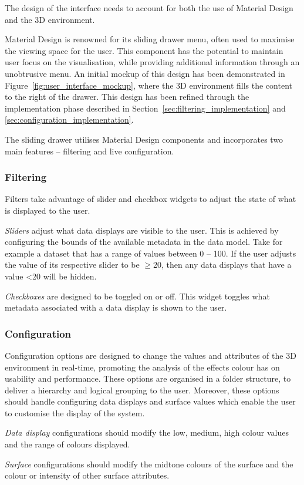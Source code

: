 {{		The design of the interface needs to account for both the use of Material Design and the 3D environment. 

		Material Design is renowned for its sliding drawer menu, often used to maximise the viewing space for the user. This component has the potential to maintain user focus on the visualisation, while providing additional information through an unobtrusive menu. An initial mockup of this design has been demonstrated in Figure~\ref{fig:user_interface_mockup}, where the 3D environment fills the content to the right of the drawer. This design has been refined through the implementation phase described in Section~\ref{sec:filtering_implementation} and \ref{sec:configuration_implementation}.

		

		The sliding drawer utilises Material Design components and incorporates two main features -- filtering and live configuration.

		\subsubsection{Filtering} {
		\label{sec:filtering}

			Filters take advantage of slider and checkbox widgets to adjust the state of what is displayed to the user.

			\emph{Sliders} adjust what data displays are visible to the user. This is achieved by configuring the bounds of the available metadata in the data model. Take for example a dataset that has a range of values between 0 -- 100. If the user adjusts the value of its respective slider to be $\ge$20, then any data displays that have a value \textless20 will be hidden.
			
			\emph{Checkboxes} are designed to be toggled on or off. This widget toggles what metadata associated with a data display is shown to the user.

		}

		\subsubsection{Configuration} {
		\label{sec:configuration}

			Configuration options are designed to change the values and attributes of the 3D environment in real-time, promoting the analysis of the effects colour has on usability and performance. These options are organised in a folder structure, to deliver a hierarchy and logical grouping to the user. Moreover, these options should handle configuring data displays and surface values which enable the user to customise the display of the system.

			\emph{Data display} configurations should modify the low, medium, high colour values and the range of colours displayed.

			\emph{Surface} configurations should modify the midtone colours of the surface and the colour or intensity of other surface attributes.

		}

	}

}

